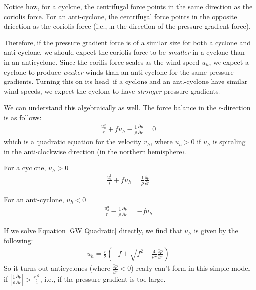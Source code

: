 Notice how, for a cyclone, the centrifugal force points in the same direction as the coriolis force. For an anti-cyclone, the centrifugal force points in the opposite driection as the coriolis force (i.e., in the direction of the pressure gradient force).

Therefore, if the pressure gradient force is of a similar size for both a cyclone and anti-cyclone, we should expect the coriolis force to be \textit{smaller} in a cyclone than in an anticyclone. Since the corilis force scales as the wind speed $u_h$, we expect a cyclone to produce \textit{weaker} winds than an anti-cyclone for the same pressure gradients. Turning this on its head, if a cyclone and an anti-cyclone have similar wind-speeds, we expect the cyclone to have \textit{stronger} pressure gradients.

We can understand this algebraically as well. The force balance in the $r$-direction is as follows:
\begin{align}
    \label{GW Quadratic}
    \boxed{
        \frac{u_h^2}{r}+fu_h-\frac{1}{\rho}\frac{\partial p}{\partial r}=0
    }
\end{align}
which is a quadratic equation for the velocity $u_h$, where $u_h>0$ if $u_h$ is spiraling in the anti-clockwise direction (in the northern hemisphere). \vspace{2mm}

\begin{minipage}{.48\linewidth}
    \centering
    For a cyclone, $u_h>0$
    \begin{align*}
        \frac{u_h^2}{r}+fu_h = \frac{1}{\rho}\frac{\partial p}{\partial r}
    \end{align*}
\end{minipage}
\hfill
\begin{minipage}{.48\linewidth}
    \centering
    For an anti-cyclone, $u_h<0$
    \begin{align*}
        \frac{u_h^2}{r} - \frac{1}{\rho}\frac{\partial p}{\partial r} = -fu_h
    \end{align*}
\end{minipage}

\vspace{2mm}
If we solve Equation \ref{GW Quadratic} directly, we find that $u_h$ is given by the following:
\begin{align*}
    u_h = \frac{r}{2} \left( 
        -f \pm \sqrt{f^2 + \frac{4}{\rho r}\frac{\partial p}{\partial r}}
     \right)
\end{align*}
So it turns out anticyclones (where $\frac{\partial p}{\partial r}<0$) really can't form in this simple model if $\left|\frac{1}{\rho}\frac{\partial p}{\partial r}\right|>\frac{rf^2}{4}$, i.e., if the pressure gradient is too large.

